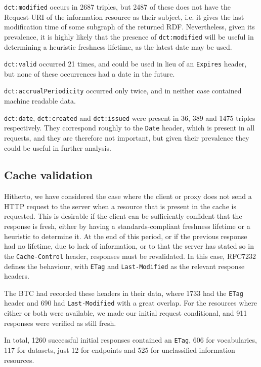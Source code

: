 \documentclass{llncs}
\newcommand{\rdfterm}[1]{\texttt{#1}}
\newcommand{\httph}[1]{\texttt{#1}}
\begin{document}
\rdfterm{dct:modified} occurs in 2687 triples, but 2487 of these does
not have the Request-URI of the information resource as their subject,
i.e. it gives the last modification time of some subgraph of the
returned RDF. Nevertheless, given its prevalence, it is highly likely
that the presence of \rdfterm{dct:modified} will be useful in
determining a heuristic freshness lifetime, as the latest date may be
used.

\rdfterm{dct:valid} occurred 21 times, and could be used in lieu of an
\httph{Expires} header, but none of these occurrences had a date in the
future.

\rdfterm{dct:accrualPeriodicity} occurred only twice, and in neither
case contained machine readable data.

\rdfterm{dct:date}, \rdfterm{dct:created} and \rdfterm{dct:issued}
were present in 36, 389 and 1475 triples respectively. They correspond
roughly to the \httph{Date} header, which is present in all requests,
and they are therefore not important, but given their prevalence they
could be useful in further analysis.

\subsection{Cache validation}

Hitherto, we have considered the case where the client or proxy does
not send a HTTP request to the server when a resource that is present
in the cache is requested. This is desirable if the client can be
sufficiently confident that the response is fresh, either by having a
standards-compliant freshness lifetime or a heuristic to determine
it. At the end of this period, or if the previous response had no
lifetime, due to lack of information, or to that the server has stated
so in the \httph{Cache-Control} header, responses must be
revalidated. In this case, RFC7232 defines the behaviour, with
\httph{ETag} and \httph{Last-Modified} as the relevant response
headers.

The BTC had recorded these headers in their data, where 1733 had the
\httph{ETag} header and 690 had \httph{Last-Modified} with a great
overlap. For the resources where either or both were available, we
made our initial request conditional, and 911 responses were verified
as still fresh. 

In total, 1260 successful initial responses contained
an \httph{ETag}, 606 for vocabularies, 117 for datasets, just 12 for
endpoints and 525 for unclassified information resources.
\end{document}
